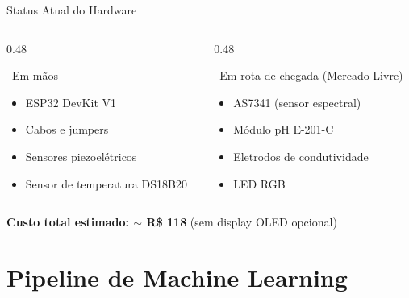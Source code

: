 \documentclass[aspectratio=169, 11pt]{beamer}
\begin{document}
\begin{frame}{Status Atual do Hardware}
  \begin{columns}[T]
    \begin{column}{0.48\textwidth}
      \begin{exampleblock}{\faCheckCircle\ Em mãos}
        \begin{itemize}
          \item[\textcolor{green!60!black}{\faCheck}] ESP32 DevKit V1
          \item[\textcolor{green!60!black}{\faCheck}] Cabos e jumpers
          \item[\textcolor{green!60!black}{\faCheck}] Sensores piezoelétricos
          \item[\textcolor{green!60!black}{\faCheck}] Sensor de temperatura DS18B20
        \end{itemize}
      \end{exampleblock}
    \end{column}
    \begin{column}{0.48\textwidth}
      \begin{alertblock}{\faTruck\ Em rota de chegada (Mercado Livre)}
        \begin{itemize}
          \item[\textcolor{orange}{\faClock}] AS7341 (sensor espectral)
          \item[\textcolor{orange}{\faClock}] Módulo pH E-201-C
          \item[\textcolor{orange}{\faClock}] Eletrodos de condutividade
          \item[\textcolor{orange}{\faClock}] LED RGB
        \end{itemize}
      \end{alertblock}
    \end{column}
  \end{columns}
  \vspace{0.5cm}
  \begin{center}
    \textbf{Custo total estimado: $\sim$ R\$ 118} (sem display OLED opcional)
  \end{center}
\end{frame}

\section{Pipeline de Machine Learning}
\end{document}
